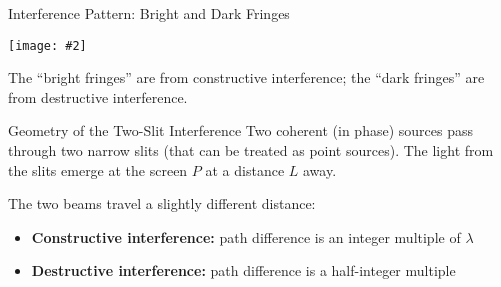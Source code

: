 \documentclass[compress,aspectratio=169]{beamer}
\newcommand{\pic}[2]{\texttt{[image: \#2]}}
\begin{document}
\begin{frame}{Interference Pattern: Bright and Dark Fringes}
  \begin{center}
    \pic{.4}{graphics/fringes1.png}
  \end{center}
  The ``bright fringes'' are from constructive interference; the ``dark
  fringes'' are from destructive interference.
\end{frame}



\begin{frame}{Geometry of the Two-Slit Interference}
  Two coherent (in phase) sources pass through two narrow slits (that can be
  treated as point sources). The light from the slits emerge at the screen $P$
  at a distance $L$ away.
  \begin{center}
  \end{center}
  The two beams travel a slightly different distance:
  \begin{itemize}
  \item\textbf{Constructive interference:} path difference is an integer multiple
    of $\lambda$
  \item\textbf{Destructive interference:} path difference is a half-integer
    multiple
  \end{itemize}
\end{frame}
\end{document}
